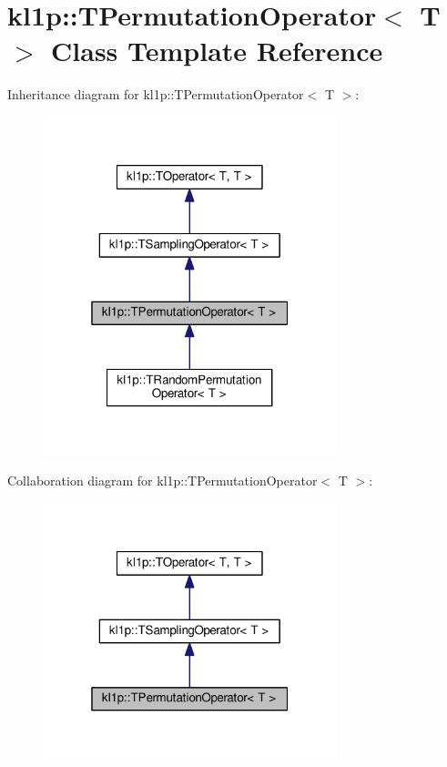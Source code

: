 \hypertarget{classkl1p_1_1TPermutationOperator}{}\section{kl1p\+:\+:T\+Permutation\+Operator$<$ T $>$ Class Template Reference}
\label{classkl1p_1_1TPermutationOperator}


Inheritance diagram for kl1p\+:\+:T\+Permutation\+Operator$<$ T $>$\+:
\nopagebreak
\begin{figure}[H]
\begin{center}
\leavevmode
\includegraphics[width=241pt]{classkl1p_1_1TPermutationOperator__inherit__graph}
\end{center}
\end{figure}


Collaboration diagram for kl1p\+:\+:T\+Permutation\+Operator$<$ T $>$\+:
\nopagebreak
\begin{figure}[H]
\begin{center}
\leavevmode
\includegraphics[width=241pt]{classkl1p_1_1TPermutationOperator__coll__graph}
\end{center}
\end{figure}
